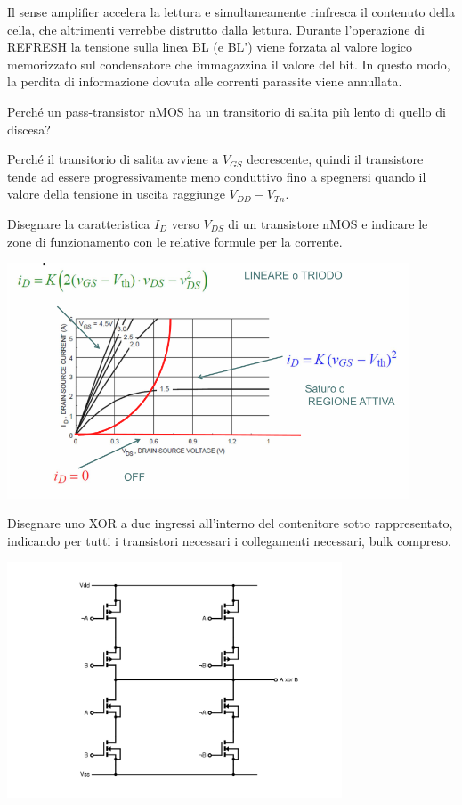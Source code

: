 \documentclass[answers,a4paper,12pt]{exam}
\begin{document}
\begin{questions}
\begin{solutionorbox}[5cm]
{}
    Il sense amplifier accelera la lettura e simultaneamente rinfresca il contenuto della cella, che altrimenti verrebbe distrutto dalla lettura.
    Durante l’operazione di REFRESH la tensione sulla linea BL (e BL’) viene forzata al valore logico memorizzato sul condensatore che immagazzina il valore del bit. 
    In questo modo, la perdita di informazione dovuta alle correnti parassite viene annullata.
\end{solutionorbox}
\question Perché un pass-transistor nMOS ha un transitorio di salita più lento di quello di discesa?
\begin{solutionorbox}[5cm]
    Perché il transitorio di salita avviene a $V_{GS}$ decrescente, quindi il transistore tende ad essere progressivamente meno conduttivo fino a spegnersi quando il valore della tensione in uscita raggiunge $V_{DD} - V_{Tn}$.
\end{solutionorbox}

\question Disegnare la caratteristica $I_D$ verso $V_{DS}$ di un transistore nMOS e indicare le zone di funzionamento con le relative formule per la corrente.
\begin{solutionorbox}[5cm]

    {\centering

    \includegraphics[height=7cm]{CurvaNMOS.png}

}
\end{solutionorbox}
\pagebreak
\question Disegnare uno XOR a due ingressi all’interno del contenitore sotto rappresentato, indicando per tutti i transistori necessari i collegamenti necessari, bulk compreso.
\begin{solutionorbox}[5cm]

{\centering

    \includegraphics[height=7cm]{CMOSXOR.png}

}
\end{solutionorbox}
\end{questions}
\end{document}
